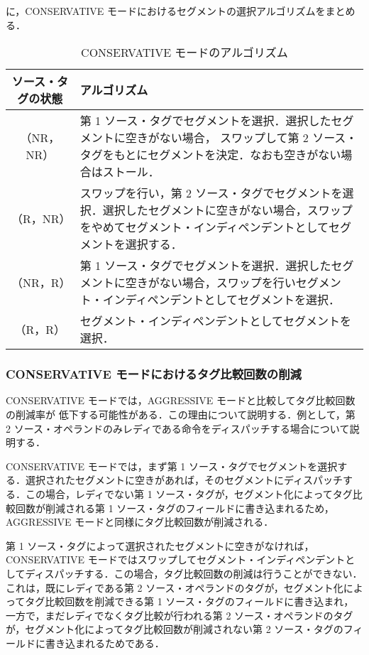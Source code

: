 に，CONSERVATIVE モードにおけるセグメントの選択アルゴリズムをまとめる．

\begin{table}[htb]
  \caption{CONSERVATIVE モードのアルゴリズム}
  \footnotesize
  \center
   \begin{tabular}{|c|p{13.5cm}|} \hline \hline
    ソース・タグの状態 & アルゴリズム \\ \hline
    （NR，NR） & 第 1 ソース・タグでセグメントを選択．選択したセグメントに空きがない場合， スワップして第 2 ソース・タグをもとにセグメントを決定．なおも空きがない場合はストール． \\ \hline
    （R，NR） & スワップを行い，第 2 ソース・タグでセグメントを選択．選択したセグメントに空きがない場合，スワップをやめてセグメント・インディペンデントとしてセグメントを選択する．\\ \hline
    （NR，R） & 第 1 ソース・タグでセグメントを選択．選択したセグメントに空きがない場合，スワップを行いセグメント・インディペンデントとしてセグメントを選択．\\ \hline
    （R，R） & セグメント・インディペンデントとしてセグメントを選択． \\ \hline
  \end{tabular}
  \label{tab:cons_algorithm}
\end{table}

\subsubsection{CONSERVATIVE モードにおけるタグ比較回数の削減}
CONSERVATIVE モードでは，AGGRESSIVE モードと比較してタグ比較回数の削減率が 低下する可能性がある．この理由について説明する．例として，第 2 ソース・オペランドのみレディである命令をディスパッチする場合について説明する．

CONSERVATIVE モードでは，まず第 1 ソース・タグでセグメントを選択する．選択されたセグメントに空きがあれば，そのセグメントにディスパッチする．この場合，レディでない第 1 ソース・タグが，セグメント化によってタグ比較回数が削減される第 1 ソース・タグのフィールドに書き込まれるため，AGGRESSIVE モードと同様にタグ比較回数が削減される．

第 1 ソース・タグによって選択されたセグメントに空きがなければ，CONSERVATIVE モードではスワップしてセグメント・インディペンデントとしてディスパッチする．この場合，タグ比較回数の削減は行うことができない．これは，既にレディである第 2 ソース・オペランドのタグが，セグメント化によってタグ比較回数を削減できる第 1 ソース・タグのフィールドに書き込まれ，一方で，まだレディでなくタグ比較が行われる第 2 ソース・オペランドのタグが，セグメント化によってタグ比較回数が削減されない第 2 ソース・タグのフィールドに書き込まれるためである．

